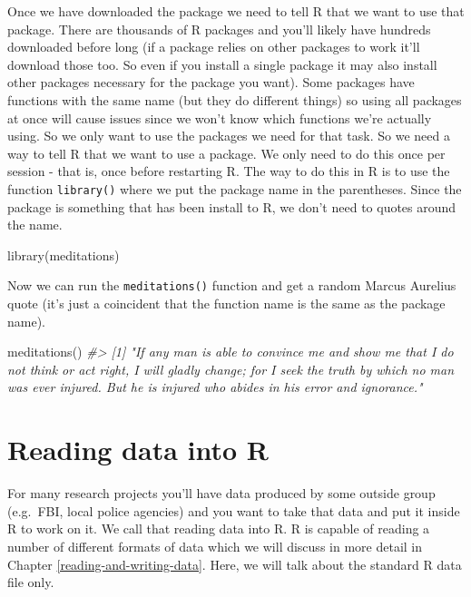 \documentclass[
]{krantz}
\makeatletter
\newenvironment{Shaded}{\begin{snugshade}}{\end{snugshade}}
\newcommand{\CommentTok}[1]{\textcolor[rgb]{0.37,0.37,0.37}{\textit{#1}}}
\newcommand{\FunctionTok}[1]{\textcolor[rgb]{0,0,0}{#1}}
\newcommand{\NormalTok}[1]{#1}
\newenvironment{kframe}{%
\medskip{}
\setlength{\fboxsep}{.8em}
 \def\at@end@of@kframe{}%
 \ifinner\ifhmode%
  \def\at@end@of@kframe{\end{minipage}}%
  \begin{minipage}{\columnwidth}%
 \fi\fi%
 \def\FrameCommand##1{\hskip\@totalleftmargin \hskip-\fboxsep
 \colorbox{shadecolor}{##1}\hskip-\fboxsep
     \hskip-\linewidth \hskip-\@totalleftmargin \hskip\columnwidth}%
 \MakeFramed {\advance\hsize-\width
   \@totalleftmargin\z@ \linewidth\hsize
   \@setminipage}}%
 {\par\unskip\endMakeFramed%
 \at@end@of@kframe}
\renewenvironment{Shaded}{\begin{kframe}}{\end{kframe}}
\makeatother
\begin{document}
Once we have downloaded the package we need to tell R that we want to use that package. There are thousands of R packages and you'll likely have hundreds downloaded before long (if a package relies on other packages to work it'll download those too. So even if you install a single package it may also install other packages necessary for the package you want). Some packages have functions with the same name (but they do different things) so using all packages at once will cause issues since we won't know which functions we're actually using. So we only want to use the packages we need for that task. So we need a way to tell R that we want to use a package. We only need to do this once per session - that is, once before restarting R. The way to do this in R is to use the function \texttt{library()} where we put the package name in the parentheses. Since the package is something that has been install to R, we don't need to quotes around the name.

\begin{Shaded}
\begin{Highlighting}[]
\FunctionTok{library}\NormalTok{(meditations)}
\end{Highlighting}
\end{Shaded}

Now we can run the \texttt{meditations()} function and get a random Marcus Aurelius quote (it's just a coincident that the function name is the same as the package name).

\begin{Shaded}
\begin{Highlighting}[]
\FunctionTok{meditations}\NormalTok{()}
\CommentTok{\#\textgreater{} [1] "If any man is able to convince me and show me that I do not think or act right, I will gladly change; for I seek the truth by which no man was ever injured. But he is injured who abides in his error and ignorance."}
\end{Highlighting}
\end{Shaded}

\hypertarget{reading-data-into-r}{%
\section{Reading data into R}\label{reading-data-into-r}}

For many research projects you'll have data produced by some outside group (e.g.~FBI, local police agencies) and you want to take that data and put it inside R to work on it. We call that reading data into R. R is capable of reading a number of different formats of data which we will discuss in more detail in Chapter \ref{reading-and-writing-data}. Here, we will talk about the standard R data file only.
\end{document}

